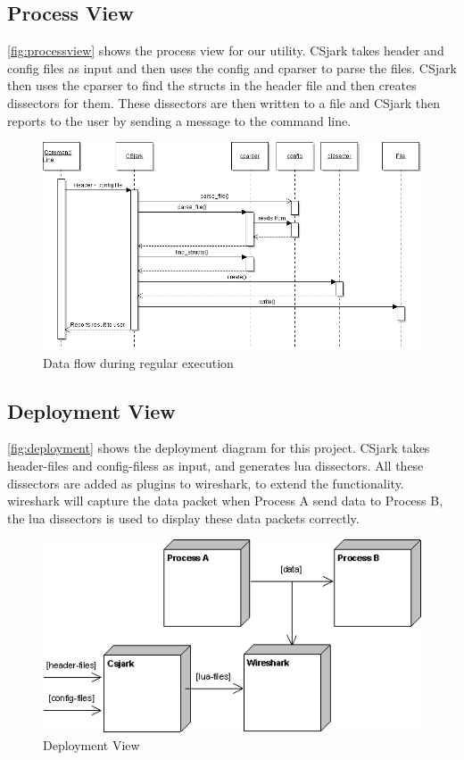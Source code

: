 \subsection{Process View}
\autoref{fig:processview} shows the process view for our \gls{utility}. CSjark takes \gls{header} and config files as input and then uses the config and cparser to parse the files. CSjark then uses the cparser to find the \glspl{struct} in the \gls{header} file and then creates \glspl{dissector} for them. These \glspl{dissector} are then written to a file and CSjark then reports to the user by sending a message to the command line.

\begin{figure}[htb]
	\includegraphics[width=\textwidth]{./planning/img/SequenceDiagram}
	\caption{Data flow during regular execution\label{fig:processview}}
\end{figure}


\subsection{Deployment View}
\autoref{fig:deployment} shows the deployment diagram for this project. CSjark 
takes \gls{header}-files and config-filess as input, and generates \Gls{lua} 
\glspl{dissector}. All these \glspl{dissector} are added as plugins to 
\Gls{wireshark}, to extend the functionality. \Gls{wireshark} will capture the 
data packet when Process A send data to Process B, the \Gls{lua} 
\glspl{dissector} is used to display these data packets correctly.

\begin{figure}[htb]
	\includegraphics[width = \textwidth]{./planning/img/Deployment}
	\caption{Deployment View\label{fig:deployment}}
\end{figure}



